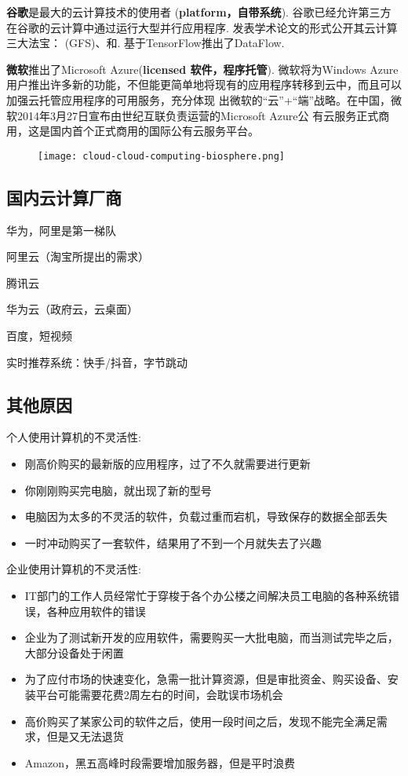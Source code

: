 \textbf{谷歌}是最大的云计算技术的使用者 (\textbf{platform，自带系统}). 谷歌已经允许第三方在谷歌的云计算中通过运行大型并行应用程序. 发表学术论文的形式公开其云计算三大法宝： (GFS)、和. 基于TensorFlow推出了DataFlow.


\textbf{微软}推出了Microsoft Azure(\textbf{licensed 软件，程序托管}). 微软将为Windows Azure用户推出许多新的功能，不但能更简单地将现有的应用程序转移到云中，而且可以加强云托管应用程序的可用服务，充分体现 出微软的“云”+“端”战略。在中国，微软2014年3月27日宣布由世纪互联负责运营的Microsoft Azure公 有云服务正式商用，这是国内首个正式商用的国际公有云服务平台。

\begin{figure}[htbp]
    \centering
    \texttt{[image: cloud-cloud-computing-biosphere.png]}
\end{figure}

\subsection{国内云计算厂商}

华为，阿里是第一梯队

阿里云（淘宝所提出的需求） 

腾讯云 

华为云（政府云，云桌面）

百度，短视频

实时推荐系统：快手/抖音，字节跳动

\subsection{其他原因}

个人使用计算机的不灵活性:

\begin{itemize}
    \item 刚高价购买的最新版的应用程序，过了不久就需要进行更新
    \item 你刚刚购买完电脑，就出现了新的型号
    \item 电脑因为太多的不灵活的软件，负载过重而宕机，导致保存的数据全部丢失
    \item 一时冲动购买了一套软件，结果用了不到一个月就失去了兴趣
\end{itemize}

企业使用计算机的不灵活性:

\begin{itemize}
    
    \item IT部门的工作人员经常忙于穿梭于各个办公楼之间解决员工电脑的各种系统错误，各种应用软件的错误
    \item 企业为了测试新开发的应用软件，需要购买一大批电脑，而当测试完毕之后，大部分设备处于闲置
    \item 为了应付市场的快速变化，急需一批计算资源，但是审批资金、购买设备、安装平台可能需要花费2周左右的时间，会耽误市场机会
    \item 高价购买了某家公司的软件之后，使用一段时间之后，发现不能完全满足需求，但是又无法退货
    \item Amazon，黑五高峰时段需要增加服务器，但是平时浪费
\end{itemize}


